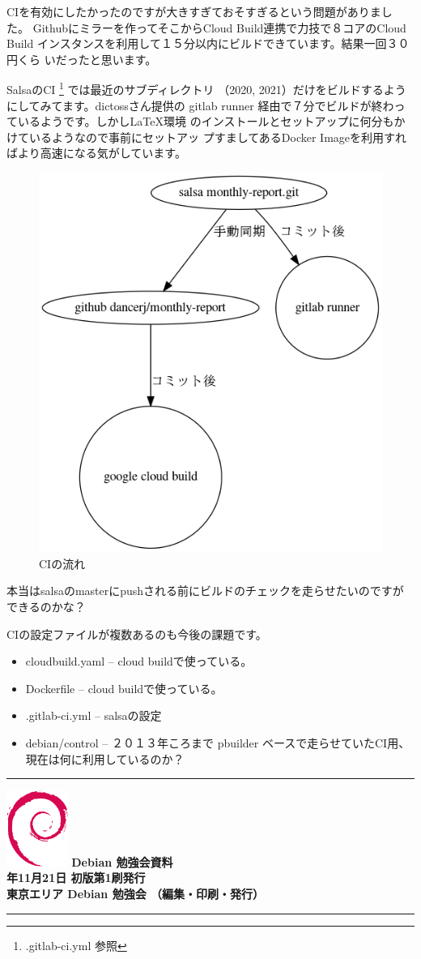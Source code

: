 \documentclass[mingoth,a4paper]{jsarticle}
\newcommand{\debmtgyear}{2020}
\newcommand{\debmtgmonth}{11}
\newcommand{\debmtgdate}{21}
\begin{document}
CIを有効にしたかったのですが大きすぎておそすぎるという問題がありました。
Githubにミラーを作ってそこからCloud Build連携で力技で８コアのCloud Build
インスタンスを利用して１５分以内にビルドできています。結果一回３０円くら
いだったと思います。

SalsaのCI \footnote{.gitlab-ci.yml 参照} では最近のサブディレクトリ
（2020, 2021）だけをビルドするようにしてみてます。dictossさん提供の
gitlab runner 経由で７分でビルドが終わっているようです。しかしLaTeX環境
のインストールとセットアップに何分もかけているようなので事前にセットアッ
プすましてあるDocker Imageを利用すればより高速になる気がしています。

\begin{figure}[h]
\begin{center}
\includegraphics[keepaspectratio,width=0.5\hsize]{image202011/debci.png}
\end{center}
\caption{CIの流れ}
\label{fig:monthlyreport-ci-configuration}
\end{figure}

本当はsalsaのmasterにpushされる前にビルドのチェックを走らせたいのですが
できるのかな？

CIの設定ファイルが複数あるのも今後の課題です。

\begin{itemize}
 \item cloudbuild.yaml -- cloud buildで使っている。
 \item Dockerfile -- cloud buildで使っている。
 \item .gitlab-ci.yml -- salsaの設定
 \item debian/control -- ２０１３年ころまで pbuilder ベースで走らせていたCI用、現在は何に利用しているのか？
\end{itemize}

\mbox{}\newpage
\mbox{}\newpage

\vspace*{15cm}
\hrule
\vspace{2mm}
\includegraphics[width=2cm]{image200502/openlogo-nd.eps}
\noindent \Large \bf Debian 勉強会資料\\
\noindent \normalfont \debmtgyear{}年\debmtgmonth{}月\debmtgdate{}日 \hspace{5mm}  初版第1刷発行\\
\noindent \normalfont 東京エリア Debian 勉強会 （編集・印刷・発行）\\
\hrule
\end{document}

